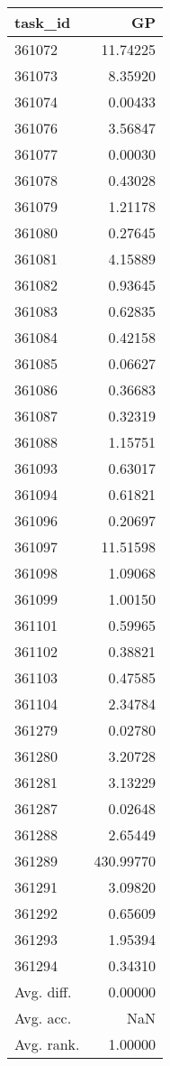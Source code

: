 \begin{tabular}{lr}
\toprule
task\_id & GP \\
\midrule
361072 & 11.74225 \\
361073 & 8.35920 \\
361074 & 0.00433 \\
361076 & 3.56847 \\
361077 & 0.00030 \\
361078 & 0.43028 \\
361079 & 1.21178 \\
361080 & 0.27645 \\
361081 & 4.15889 \\
361082 & 0.93645 \\
361083 & 0.62835 \\
361084 & 0.42158 \\
361085 & 0.06627 \\
361086 & 0.36683 \\
361087 & 0.32319 \\
361088 & 1.15751 \\
361093 & 0.63017 \\
361094 & 0.61821 \\
361096 & 0.20697 \\
361097 & 11.51598 \\
361098 & 1.09068 \\
361099 & 1.00150 \\
361101 & 0.59965 \\
361102 & 0.38821 \\
361103 & 0.47585 \\
361104 & 2.34784 \\
361279 & 0.02780 \\
361280 & 3.20728 \\
361281 & 3.13229 \\
361287 & 0.02648 \\
361288 & 2.65449 \\
361289 & 430.99770 \\
361291 & 3.09820 \\
361292 & 0.65609 \\
361293 & 1.95394 \\
361294 & 0.34310 \\
Avg. diff. & 0.00000 \\
Avg. acc. & NaN \\
Avg. rank. & 1.00000 \\
\bottomrule
\end{tabular}
